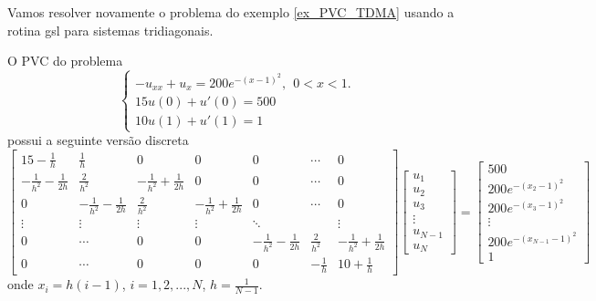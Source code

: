 \begin{ex} Vamos resolver novamente o problema do exemplo \ref{ex_PVC_TDMA} usando a rotina gsl para sistemas tridiagonais.
\end{ex}
O PVC do problema
$$\left\{\begin{array}{l}-u_{xx}+u_x=200e^{-(x-1)^2},~~ 0<x<1.\\
15u(0)+u'(0)=500\\
10u(1)+u'(1)=1\end{array}
\right.
$$
possui a seguinte versão discreta
\begin{equation*}
 \left[\begin{array}{ccccccc}
        15-\frac{1}{h}&\frac{1}{h}&0&0&0&\cdots&0\\
        -\frac{1}{h^2}-\frac{1}{2h}&\frac{2}{h^2}&-\frac{1}{h^2}+\frac{1}{2h}&0&0&\cdots&0\\
              0&  -\frac{1}{h^2}-\frac{1}{2h}&\frac{2}{h^2}&-\frac{1}{h^2}+\frac{1}{2h}&0&\cdots&0\\
              \vdots&\vdots&\vdots&\vdots&\ddots&&\vdots\\
              0&\cdots&0&0& -\frac{1}{h^2}-\frac{1}{2h}&\frac{2}{h^2}&-\frac{1}{h^2}+\frac{1}{2h}\\
              0&\cdots&0&0&0& -\frac{1}{h}&10+\frac{1}{h}
       \end{array}
\right]\left[\begin{array}{c}
             u_1\\u_2\\u_3 \\ \vdots\\ u_{N-1}\\u_N
             \end{array}
\right]=\left[\begin{array}{c}
             500\\200e^{-(x_2-1)^2}\\200e^{-(x_3-1)^2} \\ \vdots\\ 200e^{-(x_{N-1}-1)^2}\\1
             \end{array}
\right]
\end{equation*}
onde $x_i=h(i-1)$, $i=1,2,...,N$, $h=\frac{1}{N-1}$.
